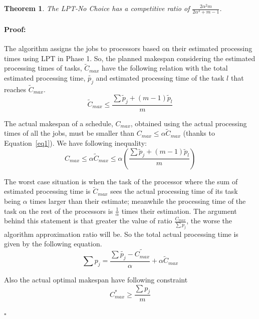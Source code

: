 \documentclass[12pt]{article}
\theoremstyle{mystyle}
\newtheorem{theorem}{Theorem}
\newenvironment{myproof}{\paragraph{Proof:}}{\hfill$\square$}
\begin{document}
   \begin{theorem}
   \label{th:strat1-ub}
   The \textit{LPT-No Choice} has a competitive ratio of $ \frac{2\alpha^{2}m}{2\alpha^{2}+ m-1}$.
   \end{theorem} 
   
   \begin{myproof}
     The algorithm assigns the jobs to processors based on their
     estimated processing times using LPT in Phase 1. So, the
     planned makespan considering the estimated processing times of tasks,
     $\tilde{C}_{max}$ have the following relation with the total
     estimated processing time, $\tilde{p_j}$ and estimated processing
     time of the task  $l$ that reaches $\tilde{C}_{max}$.
   \begin{equation}\label{eq2}
   \tilde C_{max}\leq  \frac{\sum{\tilde p_j + (m-1) \tilde p_l} }{m}
   \end{equation}
   
   The actual makespan of a schedule, $C_{max}$, obtained using the
   actual processing times of all the jobs, must be smaller than $C_{max} \leq \alpha
   \tilde C_{max}$ (thanks to Equation~\ref{eq1}). We
   have following inequality:
   \begin{equation}\label{eq3}
     C_{max}\leq \alpha \tilde C_{max}\leq \alpha \left ( \frac{\sum{\tilde p_j + (m-1) \tilde p_l} }{m} \right )
   \end{equation} 
   
   The worst case situation is when the task of the processor where the
   sum of estimated processing time is $\tilde C_{max}$ sees the actual
   processing time of its task being $\alpha$ times larger than their
   estimate; meanwhile the processing time of the task on the rest of the
   processors is $\frac{1}{\alpha}$ times their estimation. The argument
   behind this statement is that greater the value of ratio
   $\frac{C_{max}}{\sum{p_j}}$, the worse the algorithm approximation
   ratio will be. So the total actual processing time is
   given by the following equation.
    \begin{equation}\label{eq4}
    \sum {p_j} = \frac{\sum \tilde{p_j}- \tilde{C_{max}}}{\alpha} + \alpha \tilde C_{max}
    \end{equation}
    
    Also the actual optimal makespan have following constraint
    \begin{equation}\nonumber 
   C_{max}^{*}\geq \frac{\sum {p_j}}{m}
   \end{equation}
   

\end{myproof}
\end{document}
